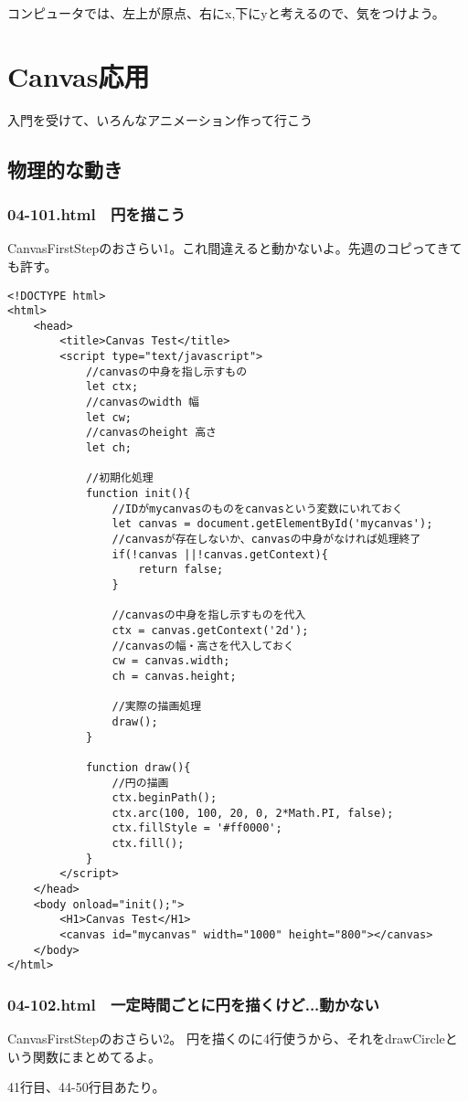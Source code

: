 \documentclass[mingoth,11pt,a4j,uplatex]{jsarticle}
\begin{document}
コンピュータでは、左上が原点、右にx,下にyと考えるので、気をつけよう。


\newpage
\section{Canvas応用}
入門を受けて、いろんなアニメーション作って行こう

\subsection{物理的な動き}
\subsubsection{04-101.html　円を描こう}
CanvasFirstStepのおさらい1。これ間違えると動かないよ。先週のコピってきても許す。
\begin{lstlisting}[caption=円を描こう]
<!DOCTYPE html>
<html>
	<head>
		<title>Canvas Test</title>
		<script type="text/javascript">
			//canvasの中身を指し示すもの
			let ctx;
			//canvasのwidth 幅
			let cw;
			//canvasのheight 高さ
			let ch;
			
			//初期化処理
			function init(){
				//IDがmycanvasのものをcanvasという変数にいれておく
				let canvas = document.getElementById('mycanvas');
				//canvasが存在しないか、canvasの中身がなければ処理終了
				if(!canvas ||!canvas.getContext){
					return false;
				}
				
				//canvasの中身を指し示すものを代入
				ctx = canvas.getContext('2d');
				//canvasの幅・高さを代入しておく
				cw = canvas.width;
				ch = canvas.height;
				
				//実際の描画処理
				draw();
			}
			
			function draw(){
				//円の描画
				ctx.beginPath();
				ctx.arc(100, 100, 20, 0, 2*Math.PI, false);
				ctx.fillStyle = '#ff0000';
				ctx.fill();
			}
		</script>
	</head>
	<body onload="init();">
		<H1>Canvas Test</H1>
		<canvas id="mycanvas" width="1000" height="800"></canvas>
	</body>
</html>
\end{lstlisting}

\subsubsection{04-102.html　一定時間ごとに円を描くけど...動かない}
CanvasFirstStepのおさらい2。
円を描くのに4行使うから、それをdrawCircleという関数にまとめてるよ。

41行目、44-50行目あたり。
\end{document}
